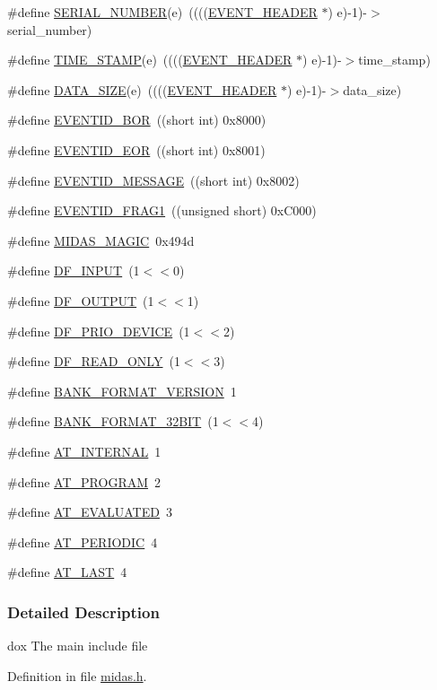 \begin{DoxyCompactItemize}
\item 
\#define \hyperlink{group__mbufferh_gadbb75a9d81e264e357bc5fc73dd4ebb8}{SERIAL\_\-NUMBER}(e)~((((\hyperlink{structEVENT__HEADER}{EVENT\_\-HEADER} $\ast$) e)-\/1)-\/$>$serial\_\-number)
\item 
\#define \hyperlink{group__mbufferh_gae8d2f03c283637c81cdcfd3fda065d53}{TIME\_\-STAMP}(e)~((((\hyperlink{structEVENT__HEADER}{EVENT\_\-HEADER} $\ast$) e)-\/1)-\/$>$time\_\-stamp)
\item 
\#define \hyperlink{group__mbufferh_ga5327bc310729f5ec36b917ed13e6ff66}{DATA\_\-SIZE}(e)~((((\hyperlink{structEVENT__HEADER}{EVENT\_\-HEADER} $\ast$) e)-\/1)-\/$>$data\_\-size)
\item 
\#define \hyperlink{group__mbufferh_gaea58a47233f988dd2f9a0320d99734dc}{EVENTID\_\-BOR}~((short int) 0x8000)
\item 
\#define \hyperlink{group__mbufferh_ga8f46d90b4c90a2387685d422625c654f}{EVENTID\_\-EOR}~((short int) 0x8001)
\item 
\#define \hyperlink{group__mbufferh_ga7fefe6ad78331e8cfb3d2b31dbfdd2d0}{EVENTID\_\-MESSAGE}~((short int) 0x8002)
\item 
\#define \hyperlink{group__mbufferh_gaae07538917933e32355933ac1e2e3d60}{EVENTID\_\-FRAG1}~((unsigned short) 0xC000)
\item 
\#define \hyperlink{group__mbufferh_ga028a14f85456b68bf2babd1bdcaa1abb}{MIDAS\_\-MAGIC}~0x494d
\item 
\#define \hyperlink{group__mequipment_gace7257be62c3d56a883e4ad1dff6fdda}{DF\_\-INPUT}~(1$<$$<$0)
\item 
\#define \hyperlink{group__mequipment_ga9a302762256e89a266256dcadd31b90b}{DF\_\-OUTPUT}~(1$<$$<$1)
\item 
\#define \hyperlink{group__mequipment_ga14cf699d29a6edd2088b83e17cda6744}{DF\_\-PRIO\_\-DEVICE}~(1$<$$<$2)
\item 
\#define \hyperlink{group__mequipment_ga4dc67d22ff12f3b0e6daff496f870a7f}{DF\_\-READ\_\-ONLY}~(1$<$$<$3)
\item 
\#define \hyperlink{group__mbank_gaee768d2c28265eb2b34227d7eae57a18}{BANK\_\-FORMAT\_\-VERSION}~1
\item 
\#define \hyperlink{group__mbank_gadc7ea449441f9c3bbe110cf41333bc7b}{BANK\_\-FORMAT\_\-32BIT}~(1$<$$<$4)
\item 
\#define \hyperlink{group__malarmh_ga0aecd2654d62ebd6b3d8d57ef8ccf2d9}{AT\_\-INTERNAL}~1
\item 
\#define \hyperlink{group__malarmh_ga258ba8c74f1f017cc80ef51fa82e3e13}{AT\_\-PROGRAM}~2
\item 
\#define \hyperlink{group__malarmh_gabd367ea3feeb6b3fe27aaf45e9a067f6}{AT\_\-EVALUATED}~3
\item 
\#define \hyperlink{group__malarmh_ga40d5f5ba688496ddaa6f12e9a9b9f956}{AT\_\-PERIODIC}~4
\item 
\#define \hyperlink{group__malarmh_ga5f102004d1642b0878502f7a6a05fdfa}{AT\_\-LAST}~4
\end{DoxyCompactItemize}


\subsubsection{Detailed Description}
dox The main include file 

Definition in file \hyperlink{midas_8h_source}{midas.h}.